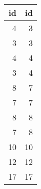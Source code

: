 \begin{tabular}{rr}
\toprule
id & id \\
\midrule
4 & 3 \\
3 & 3 \\
4 & 4 \\
3 & 4 \\
8 & 7 \\
7 & 7 \\
8 & 8 \\
7 & 8 \\
10 & 10 \\
12 & 12 \\
17 & 17 \\
\bottomrule
\end{tabular}
